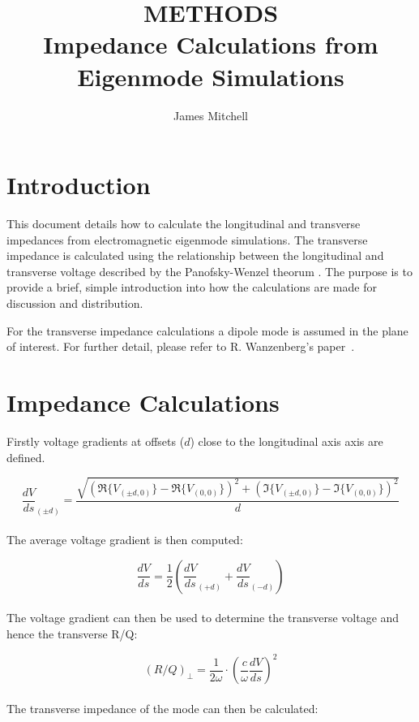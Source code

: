 \documentclass[12pt]{article}
\begin{document}
\title{\textbf{METHODS} \\ Impedance Calculations from Eigenmode Simulations}
\author{James Mitchell}
\maketitle

\section{Introduction}

This document details how to calculate the longitudinal and transverse impedances from electromagnetic eigenmode simulations.  The transverse impedance is calculated using the relationship between the longitudinal and transverse voltage described by the Panofsky-Wenzel theorum \cite{Ref_PW}.  The purpose is to provide a brief, simple introduction into how the calculations are made for discussion and distribution.

For the transverse impedance calculations a dipole mode is assumed in the plane of interest.  For further detail, please refer to R. Wanzenberg's paper~\cite{Ref_Wanzenberg}.

\section{Impedance Calculations}

\noindent Firstly voltage gradients at offsets ($d$) close to the longitudinal axis axis are defined.

\begin{equation}\label{Eq_dVdx+-}
\dfrac{dV}{ds}_{(\pm d)} = \dfrac{\sqrt{\left(\Re\{V_{(\pm d, 0)}\}-\Re\{V_{(0, 0)}\}\right)^2 + \left(\Im\{V_{(\pm d, 0)}\}-\Im\{V_{(0, 0)}\}\right)^2}}{d}
\end{equation}
\\
The average voltage gradient is then computed:

\begin{equation}\label{Eq_dVdx}
\dfrac{dV}{ds} = \dfrac{1}{2} \left( \dfrac{dV}{ds}_{(+d)} + \dfrac{dV}{ds}_{(-d)} \right)
\end{equation}
\\
The voltage gradient can then be used to determine the transverse voltage and hence the transverse R/Q:

\begin{equation}\label{Eq_R/QTransx}
(R/Q)_{\perp} = \dfrac{1}{2\omega} \cdot \left(\dfrac{c}{\omega} \dfrac{dV}{ds} \right)^2
\end{equation}
\\
The transverse impedance of the mode can then be calculated:
\end{document}
